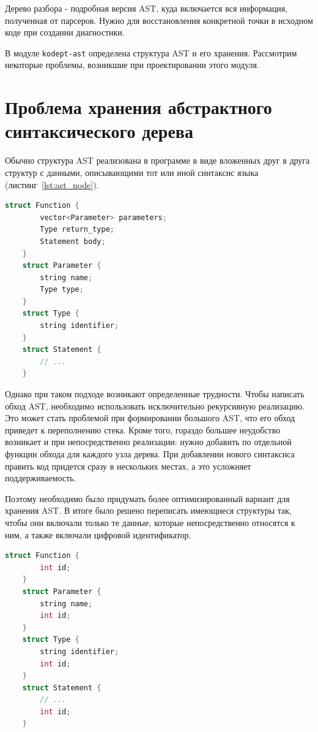 Дерево разбора - подробная версия AST, куда включается вся информация, полученная от парсеров.
Нужно для восстановления конкретной точки в исходном коде при создании диагностики.

В модуле \lstinline{kodept-ast} определена структура AST и его хранения.
Рассмотрим некоторые проблемы, возникшие при проектировании этого модуля.

\section{Проблема хранения абстрактного синтаксического дерева}
\label{sec:ast_structure}

Обычно структура AST реализована в программе в виде вложенных друг в друга структур с данными, описывающими тот или иной синтаксис языка (листинг~\ref{lst:ast_node}).

\begin{lstlisting}[language=C, label=lst:ast_node, caption={Псевдокод структур, представляющей собой описание синтаксиса функции в языке программирования.}]
    struct Function {
        vector<Parameter> parameters;
        Type return_type;
        Statement body;
    }
    struct Parameter {
        string name;
        Type type;
    }
    struct Type {
        string identifier;
    }
    struct Statement {
        // ...
    }
\end{lstlisting}

Однако при таком подходе возникают определенные трудности.
Чтобы написать обход AST, необходимо использовать исключительно рекурсивную реализацию.
Это может стать проблемой при формировании большого AST, что его обход приведет к переполнению стека.
Кроме того, гораздо большее неудобство возникает и при непосредственно реализации: нужно добавить по отдельной функции обхода для каждого узла дерева.
При добавлении нового синтаксиса править код придется сразу в нескольких местах, а это усложняет поддерживаемость.

Поэтому необходимо было придумать более оптимизированный вариант для хранения AST.
В итоге было решено переписать имеющиеся структуры так, чтобы они включали только те данные, которые непосредственно относятся к ним, а также включали цифровой идентификатор.

\begin{lstlisting}[language=C, label=lst:ast_node_after, caption={Псевдокод структур после преобразования.}]
    struct Function {
        int id;
    }
    struct Parameter {
        string name;
        int id;
    }
    struct Type {
        string identifier;
        int id;
    }
    struct Statement {
        // ...
        int id;
    }
\end{lstlisting}

